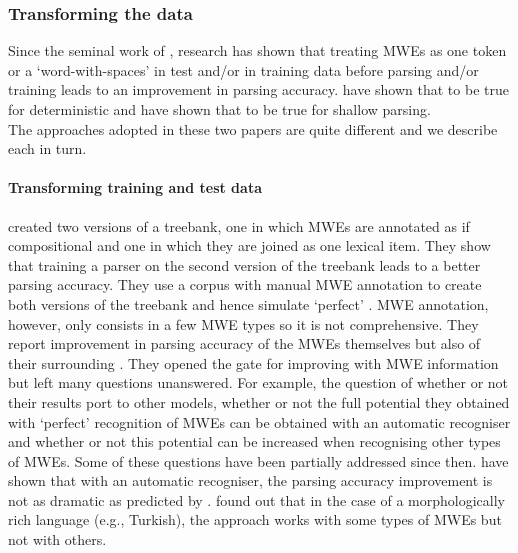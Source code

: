 \documentclass[output=paper]{langsci/langscibook}
\begin{document}
                        \subsubsection{Transforming the data}
                        \label{del:changingdata}
                        \indent Since the seminal work of \citet{nivre2004multiword}, research has shown that treating MWEs as one token or a `word-with-spaces' in test and/or in training data before parsing and/or training leads to an improvement in parsing accuracy. \citet{nivre2004multiword} have shown that to be true for deterministic  and \citet{korkontzelosetal2010} have shown that to be true for shallow parsing. \\
                        \indent The approaches adopted in these two papers are quite different and we describe each in turn.
                        \paragraph{Transforming training and test data}
                        \indent \citet{nivre2004multiword} created two versions of a treebank, one in which MWEs are annotated as if compositional and one in which they are joined as one lexical item. They show that training a parser on the second version of the treebank leads to a better parsing accuracy. They use a corpus with manual MWE annotation to create both versions of the treebank and hence simulate `perfect' . MWE annotation, however, only consists in a few MWE types so it is not comprehensive. They report improvement in parsing accuracy of the MWEs themselves but also of their surrounding . They opened the gate for improving  with MWE information but left many questions unanswered. For example, the question of whether or not their results port to other  models, whether or not the full potential they obtained with `perfect' recognition of MWEs can be obtained with an automatic recogniser and whether or not this potential can be increased when recognising other types of MWEs. Some of these questions have been partially addressed since then. \citet{constant12acl} have shown that with an automatic recogniser, the parsing accuracy improvement is not as dramatic as predicted by \citet{nivre2004multiword}. \citet{eryigit:2011:multiword} found out that in the case of a morphologically rich language (e.g., Turkish), the approach works with some types of MWEs but not with others.
\end{document}
